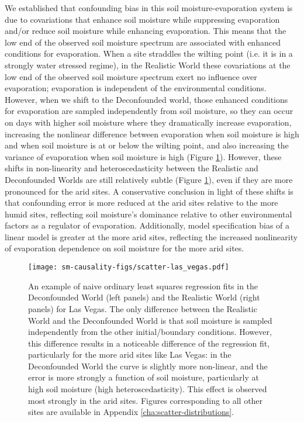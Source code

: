\documentclass[12pt]{article}
\begin{document}
We established that confounding bias in this soil moisture-evaporation
system is due to covariations that enhance soil moisture while
suppressing evaporation and/or reduce soil moisture while enhancing
evaporation. This means that the low end of the observed soil moisture
spectrum are associated with enhanced conditions for evaporation. When
a site straddles the wilting point (i.e. it is in a strongly water
stressed regime), in the Realistic World these covariations at the low
end of the observed soil moisture spectrum exert no influence over
evaporation; evaporation is independent of the environmental
conditions.  However, when we shift to the Deconfounded world, those
enhanced conditions for evaporation are sampled independently from
soil moisture, so they can occur on days with higher soil moisture
where they dramatically increase evaporation, increasing the nonlinear
difference between evaporation when soil moisture is high and when
soil moisture is at or below the wilting point, and also increasing
the variance of evaporation when soil moisture is high (Figure
\ref{fig:scatter-example}). However, these shifts in non-linearity and
heteroscedasticity between the Realistic and Deconfounded Worlds are
still relatively subtle (Figure \ref{fig:scatter-example}), even if
they are more pronounced for the arid sites. A conservative conclusion
in light of these shifts is that confounding error is more reduced at
the arid sites relative to the more humid sites, reflecting soil
moisture's dominance relative to other environmental factors as a
regulator of evaporation. Additionally, model specification bias of a
linear model is greater at the more arid sites, reflecting the
increased nonlinearity of evaporation dependence on soil moisture for
the more arid sites.

\begin{figure}
  \texttt{[image: sm-causality-figs/scatter-las\_vegas.pdf]}
  \caption{An example of naive ordinary least squares regression fits
    in the Deconfounded World (left panels) and the Realistic World
    (right panels) for Las Vegas. The only difference between the
    Realistic World and the Deconfounded World is that soil moisture
    is sampled independently from the other initial/boundary
    conditions. However, this difference results in a noticeable
    difference of the regression fit, particularly for the more arid
    sites like Las Vegas: in the Deconfounded World the curve is
    slightly more non-linear, and the error is more strongly a
    function of soil moisture, particularly at high soil moisture
    (high heteroscedasticity). This effect is observed most strongly
    in the arid sites. Figures corresponding to all other sites are
    available in Appendix \ref{cha:scatter-distributions}.}
  \label{fig:scatter-example}
\end{figure}
\end{document}

